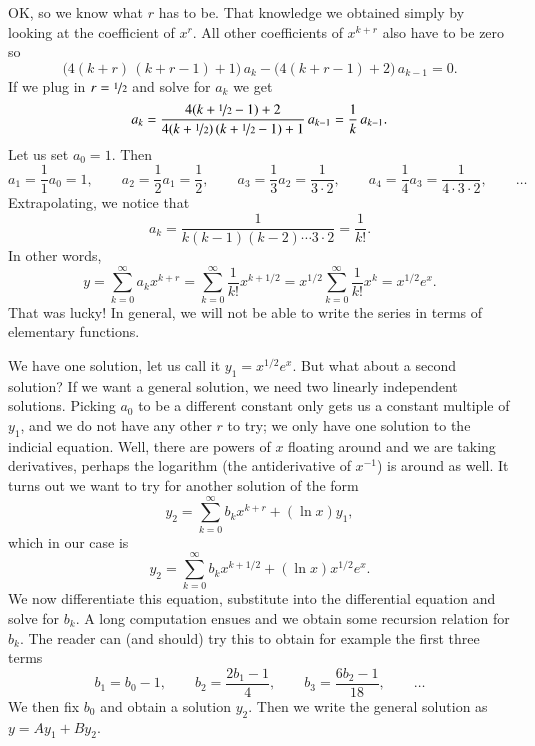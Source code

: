 \documentclass[12pt]{book}
\begin{document}
\begin{example}
OK, so we know what $r$ has to be.  That knowledge we obtained simply by looking
at the coefficient of $x^r$.  All other
coefficients of $x^{k+r}$ also have to be zero so
\begin{equation*}
\bigl( 4 (k+r)\,(k+r-1) + 1 \bigr) \, a_k
-
\bigl( 4 (k+r-1) + 2 \bigr) \, a_{k-1} = 0 .
\end{equation*}
If we plug in $r=\nicefrac{1}{2}$ and solve for $a_k$ we get
\begin{equation*}
a_k
=
\frac{4 (k+\nicefrac{1}{2}-1) + 2}{4 (k+\nicefrac{1}{2})\,(k+\nicefrac{1}{2}-1) + 1} \, a_{k-1}
=
\frac{1}{k} \, a_{k-1} .
\end{equation*}
Let us set $a_0 = 1$.  Then
\begin{equation*}
a_1 = \frac{1}{1} a_0 = 1 ,
\qquad
a_2 = \frac{1}{2} a_1 = \frac{1}{2} ,
\qquad
a_3 = \frac{1}{3} a_2 = \frac{1}{3 \cdot 2} ,
\qquad
a_4 = \frac{1}{4} a_3 = \frac{1}{4 \cdot 3 \cdot 2} ,
\qquad \dots
\end{equation*}
Extrapolating, we notice that
\begin{equation*}
a_k = \frac{1}{k(k-1)(k-2) \cdots 3 \cdot 2} = \frac{1}{k!} .
\end{equation*}
In other words,
\begin{equation*}
y = 
\sum_{k=0}^\infty a_k x^{k+r}
=
\sum_{k=0}^\infty \frac{1}{k!} x^{k+1/2}
=
x^{1/2}
\sum_{k=0}^\infty \frac{1}{k!} x^{k}
=
x^{1/2}
e^x .
\end{equation*}
That was lucky!  In general, we will not be able to write the series in
terms of elementary functions.

We have one solution, let us call it $y_1 = x^{1/2} e^x$.
But what about a second solution?  If
we want a general solution, we need two linearly independent solutions.
Picking $a_0$ to be a different constant only gets us a constant
multiple of $y_1$, and we do not have any other $r$ to try; we only
have one solution to the indicial equation.  Well, there are powers of $x$
floating around and we are taking derivatives, perhaps the logarithm (the
antiderivative of $x^{-1}$) is around as well.  It turns out we want to
try for another solution of the form
\begin{equation*}
y_2 = \sum_{k=0}^\infty b_k x^{k+r} + (\ln x) y_1 ,
\end{equation*}
which in our case is
\begin{equation*}
y_2 = \sum_{k=0}^\infty b_k x^{k+1/2} + (\ln x) x^{1/2} e^x .
\end{equation*}
We now differentiate this equation, substitute into the differential
equation and solve for $b_k$.  A long computation ensues and we
obtain some recursion relation for $b_k$.  The reader
can (and should) try this to obtain for example the first three terms
\begin{equation*}
b_1 = b_0 -1 , \qquad b_2 = \frac{2b_1-1}{4} , \qquad b_3 =
\frac{6b_2-1}{18} , \qquad \ldots
\end{equation*}
We then fix $b_0$ and obtain a solution $y_2$.  Then
we write the general solution as $y = A y_1 + B y_2$.
\end{example}
\end{document}
